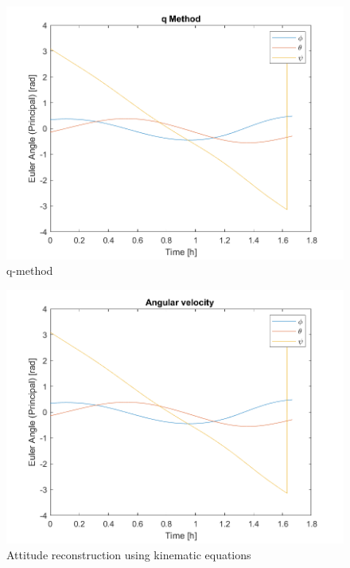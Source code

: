 \begin{figure}[H]
\centering
\includegraphics[scale=0.8]{Images/ps6_problem6_qMethod.png}
\caption{q-method}
\label{fig:Images/ps6_problem6_qMethod}
\end{figure}

\begin{figure}[H]
\centering
\includegraphics[scale=0.8]{Images/ps6_problem6_kins.png}
\caption{Attitude reconstruction using kinematic equations}
\label{fig:Images/ps6_problem6_kins}
\end{figure}